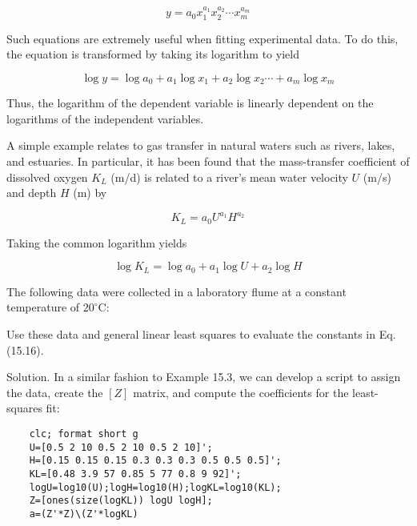 \documentclass[../main.tex]{subfiles}
\begin{document}
\begin{equation}
	\tag{15.14}
	y = a_0 x_1^{a_1} x_2^{a_2} \cdots x_m^{a_m} 
\end{equation}

\noindent Such equations are extremely useful when fitting experimental data. To do this, the equation is transformed by taking its logarithm to yield

\begin{equation}
	\tag{15.15}
	\log y = \log a_0 + a_1 \log x_1 + a_2 \log x_2 \cdots + a_m \log x_m
\end{equation}

\noindent Thus, the logarithm of the dependent variable is linearly dependent on the logarithms of the independent variables.

A simple example relates to gas transfer in natural waters such as rivers, lakes, and estuaries. In particular, it has been found that the mass-transfer coefficient of dissolved oxygen $K_L$ (m/d) is related to a river's mean water velocity $U$ (m/s) and depth $H$ (m) by

\begin{equation}
	\tag{15.16}
	K_L = a_0 U^{a_1} H^{a_2}
\end{equation}

\noindent Taking the common logarithm yields

\begin{equation}
	\tag{15.17}
	\log K_L = \log a_0 + a_1 \log U + a_2 \log H
\end{equation}

The following data were collected in a laboratory flume at a constant temperature of $20^\circ$C:


\noindent Use these data and general linear least squares to evaluate the constants in Eq. (15.16).

\noindent Solution. In a similar fashion to Example 15.3, we can develop a script to assign the
data, create the $[Z]$ matrix, and compute the coefficients for the least-squares fit:

\begin{lstlisting}[numbers=none]
	% Compute best fit of transformed values
	clc; format short g
	U=[0.5 2 10 0.5 2 10 0.5 2 10]';
	H=[0.15 0.15 0.15 0.3 0.3 0.3 0.5 0.5 0.5]';
	KL=[0.48 3.9 57 0.85 5 77 0.8 9 92]';
	logU=log10(U);logH=log10(H);logKL=log10(KL);
	Z=[ones(size(logKL)) logU logH];
	a=(Z'*Z)\(Z'*logKL)
\end{lstlisting}
\end{document}
